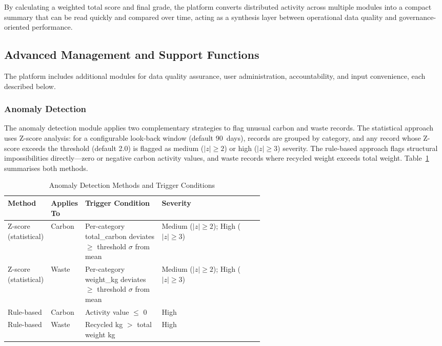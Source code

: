 \documentclass[11pt,a4paper]{article}
\begin{document}
By calculating a weighted total score and final grade, the platform converts distributed activity across multiple modules into a compact summary that can be read quickly and compared over time, acting as a synthesis layer between operational data quality and governance-oriented performance.

\subsection{Advanced Management and Support Functions}
The platform includes additional modules for data quality assurance, user administration, accountability, and input convenience, each described below.

\subsubsection{Anomaly Detection}
The anomaly detection module applies two complementary strategies to flag unusual carbon and waste records. The statistical approach uses Z-score analysis: for a configurable look-back window (default 90~days), records are grouped by category, and any record whose Z-score exceeds the threshold (default 2.0) is flagged as medium ($|z|\geq2$) or high ($|z|\geq3$) severity. The rule-based approach flags structural impossibilities directly---zero or negative carbon activity values, and waste records where recycled weight exceeds total weight. Table~\ref{tab:anomaly} summarises both methods.

\begin{table}[h]
\centering
\scriptsize
\begin{tabularx}{\linewidth}{@{}p{0.16\linewidth}p{0.12\linewidth}p{0.30\linewidth}X@{}}
\toprule
\textbf{Method} & \textbf{Applies To} & \textbf{Trigger Condition} & \textbf{Severity} \\
\midrule
Z-score (statistical) & Carbon & Per-category total\_carbon deviates $\geq$ threshold $\sigma$ from mean & Medium ($|z|\geq2$); High ($|z|\geq3$) \\
Z-score (statistical) & Waste & Per-category weight\_kg deviates $\geq$ threshold $\sigma$ from mean & Medium ($|z|\geq2$); High ($|z|\geq3$) \\
Rule-based & Carbon & Activity value $\leq$ 0 & High \\
Rule-based & Waste & Recycled kg $>$ total weight kg & High \\
\bottomrule
\end{tabularx}
\caption{Anomaly Detection Methods and Trigger Conditions}
\label{tab:anomaly}
\end{table}
\end{document}
